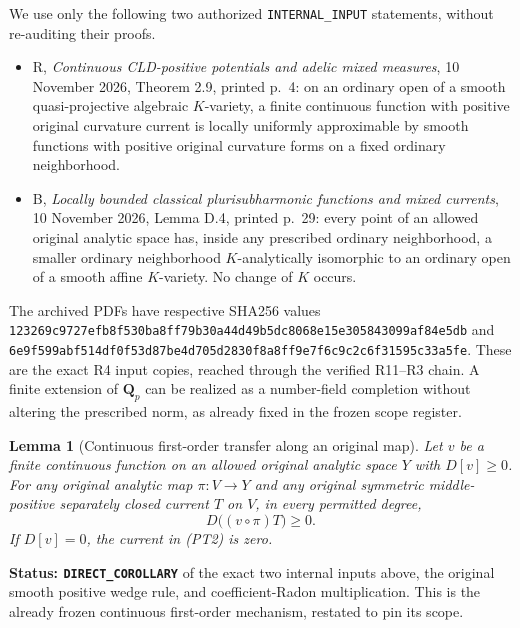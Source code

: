 \documentclass[11pt,a4paper]{article}
\numberwithin{equation}{section}
\newtheorem{lemma}[theorem]{Lemma}
\theoremstyle{definition}
\theoremstyle{remark}
\begin{document}
We use only the following two authorized \texttt{INTERNAL\_INPUT}
statements, without re-auditing their proofs.
\begin{itemize}
\item R, \emph{Continuous CLD-positive potentials and adelic mixed
measures}, 10 November 2026, Theorem 2.9, printed p.~4: on an ordinary
open of a smooth quasi-projective algebraic $K$-variety, a finite
continuous function with positive original curvature current is
locally uniformly approximable by smooth functions with positive
original curvature forms on a fixed ordinary neighborhood.
\item B, \emph{Locally bounded classical plurisubharmonic functions
and mixed currents}, 10 November 2026, Lemma D.4, printed p.~29:
every point of an allowed original analytic space has, inside any
prescribed ordinary neighborhood, a smaller ordinary neighborhood
$K$-analytically isomorphic to an ordinary open of a smooth affine
$K$-variety. No change of $K$ occurs.
\end{itemize}
The archived PDFs have respective SHA256 values
{\small\nolinkurl{123269c9727efb8f530ba8ff79b30a44d49b5dc8068e15e305843099af84e5db}}
and
{\small\nolinkurl{6e9f599abf514df0f53d87be4d705d2830f8a8ff9e7f6c9c2c6f31595c33a5fe}}.
These are the exact R4 input copies, reached through the verified
R11--R3 chain. A finite extension of $\mathbf Q_p$ can be realized
as a number-field completion without altering the prescribed norm,
as already fixed in the frozen scope register.

\begin{lemma}[Continuous first-order transfer along an original map]
\label{lem:r12-continuous-original-map-transfer}
Let $v$ be a finite continuous function on an allowed original
analytic space $Y$ with $D[v]\ge0$. For any original analytic map
$\pi:V\to Y$ and any original symmetric middle-positive separately
closed current $T$ on $V$, in every permitted degree,
\[
                           D\bigl((v\circ\pi)T\bigr)\ge0.
 \tag{PT2}
\]
If $D[v]=0$, the current in (PT2) is zero.
\end{lemma}

\noindent\textbf{Status: \texttt{DIRECT\_COROLLARY}} of the exact
two internal inputs above, the original smooth positive wedge rule,
and coefficient-Radon multiplication. This is the already frozen
continuous first-order mechanism, restated to pin its scope.
\end{document}
